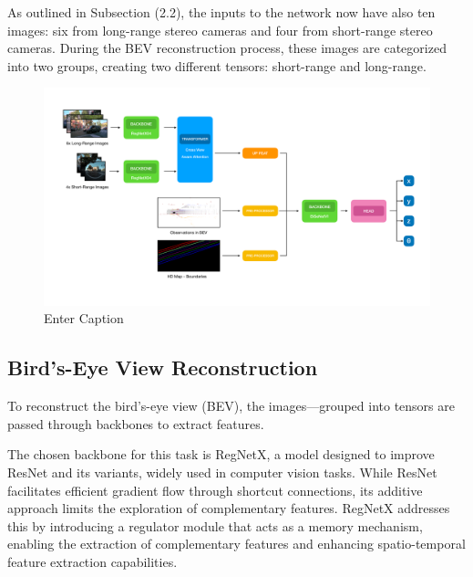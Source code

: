 As outlined in Subsection (2.2), the inputs to the network now have also ten images: six from long-range stereo cameras and four from short-range stereo cameras. During the BEV reconstruction process, these images are categorized into two groups, creating two different tensors: short-range and long-range.
\begin{figure}[H]
    \centering
    \includegraphics[width=1\linewidth]{LateX//figs/architecture2.pdf}
    \caption{Enter Caption}
    \label{fig:bev-architecture}
\end{figure}

\subsection*{Bird’s-Eye View Reconstruction}
To reconstruct the bird’s-eye view (BEV), the images—grouped into tensors are passed through backbones to extract features. 

The chosen backbone for this task is RegNetX, a model designed to improve ResNet and its variants, widely used in computer vision tasks. While ResNet facilitates efficient gradient flow through shortcut connections, its additive approach limits the exploration of complementary features. RegNetX addresses this by introducing a regulator module that acts as a memory mechanism, enabling the extraction of complementary features and enhancing spatio-temporal feature extraction capabilities.

